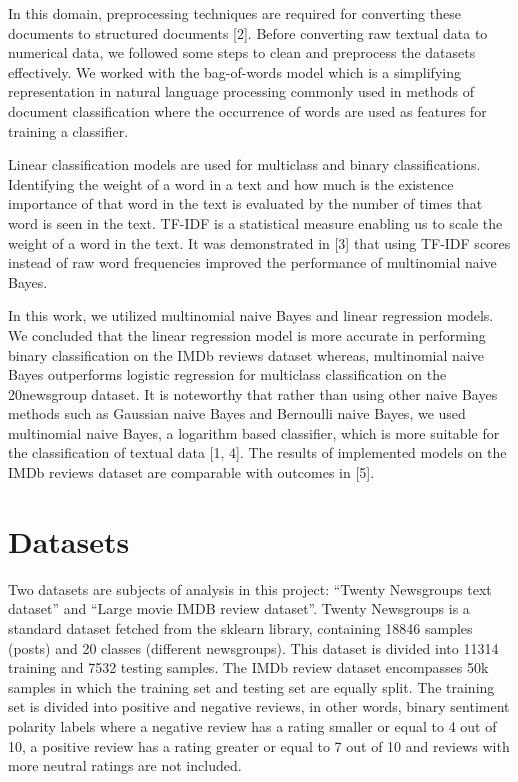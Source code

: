 \documentclass[10pt]{article}
\begin{document}
In this domain, preprocessing techniques are required for converting these documents to structured documents [2]. Before converting raw textual data to numerical data, we followed some steps to clean and preprocess the datasets effectively. We worked with the bag-of-words model which is a simplifying representation in natural language processing commonly used in methods of document classification where the occurrence of words are used as features for training a classifier.

Linear classification models are used for multiclass and binary classifications. Identifying the weight of a word in a text and how much is the existence importance of that word in the text is evaluated by the number of times that word is seen in the text. TF-IDF is a statistical measure enabling us to scale the weight of a word in the text. It was demonstrated in [3] that using TF-IDF scores instead of raw word frequencies improved the performance of multinomial naive Bayes.

In this work, we utilized multinomial naive Bayes and linear regression models. We concluded that the linear regression model is more accurate in performing binary classification on the IMDb reviews dataset whereas, multinomial naive Bayes outperforms logistic regression for multiclass classification on the 20newsgroup dataset. It is noteworthy that rather than using other naive Bayes methods such as Gaussian naive Bayes and Bernoulli naive Bayes, we used multinomial naive Bayes, a logarithm based classifier, which is more suitable for the classification of textual data [1, 4]. The results of implemented models on the IMDb reviews dataset are comparable with outcomes in [5].

\section{Datasets}
Two datasets are subjects of analysis in this project: “Twenty Newsgroups text dataset” and “Large movie IMDB review dataset”.  Twenty Newsgroups is a standard dataset fetched from the sklearn library, containing 18846 samples (posts) and 20 classes (different newsgroups). This dataset is divided into 11314 training and 7532 testing samples. The IMDb review dataset encompasses 50k samples in which the training set and testing set are equally split. The training set is divided into positive and negative reviews, in other words, binary sentiment polarity labels where a negative review has a rating smaller or equal to 4 out of 10, a positive review has a rating greater or equal to 7 out of 10 and reviews with more neutral ratings are not included.
\end{document}
